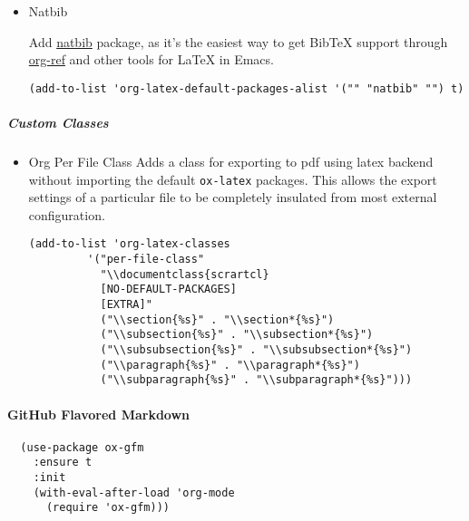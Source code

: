 \documentclass[11pt]{article}
\begin{document}
\begin{itemize}
\item Natbib
\label{sec:orgaafcae6}

Add \href{https://ctan.org/pkg/natbib?lang=en}{natbib} package, as it's the easiest way to get BibTeX support
through \href{https://github.com/jkitchin/org-ref/blob/master/org-ref.org}{org-ref} and other tools for \LaTeX{} in Emacs.

\begin{verbatim}
(add-to-list 'org-latex-default-packages-alist '("" "natbib" "") t)
\end{verbatim}
\end{itemize}

\subparagraph*{Custom Classes}
\label{sec:org5eb231c}
\begin{itemize}
\item Org Per File Class
\label{sec:orgc010ab3}
Adds a class for exporting to pdf using latex backend without
importing the default \texttt{ox-latex} packages. This allows the export
settings of a particular file to be completely insulated from most external
configuration.

\begin{verbatim}
(add-to-list 'org-latex-classes
	     '("per-file-class"
	       "\\documentclass{scrartcl}
	       [NO-DEFAULT-PACKAGES]
	       [EXTRA]"
	       ("\\section{%s}" . "\\section*{%s}")
	       ("\\subsection{%s}" . "\\subsection*{%s}")
	       ("\\subsubsection{%s}" . "\\subsubsection*{%s}")
	       ("\\paragraph{%s}" . "\\paragraph*{%s}")
	       ("\\subparagraph{%s}" . "\\subparagraph*{%s}")))
\end{verbatim}
\end{itemize}

\paragraph*{GitHub Flavored Markdown}
\label{sec:orgaa51f6a}

\begin{verbatim}
  (use-package ox-gfm
    :ensure t
    :init
    (with-eval-after-load 'org-mode
      (require 'ox-gfm)))
\end{verbatim}
\end{document}
